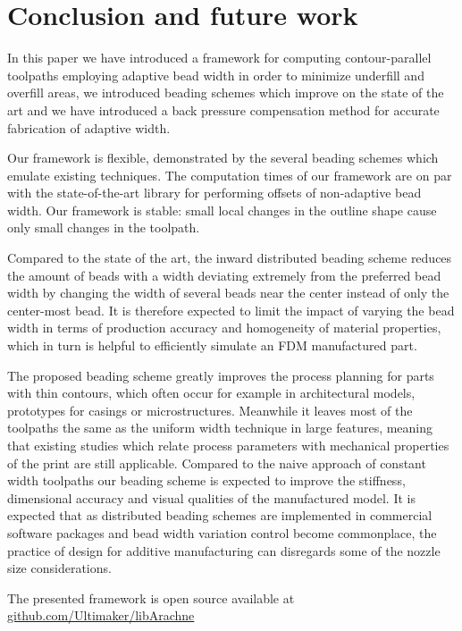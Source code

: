 \section{Conclusion and future work}
In this paper we have introduced a framework for computing contour-parallel toolpaths employing adaptive bead width in order to minimize underfill and overfill areas{,
we introduced beading schemes which improve on the state of the art
and we have introduced a back pressure compensation method for accurate fabrication of adaptive width.
}

Our framework is flexible, demonstrated by the several beading schemes which emulate existing techniques.
The computation times of our framework are on par with the state-of-the-art library for performing offsets of non-adaptive bead width.
Our framework is stable: small local changes in the outline shape cause only small changes in the toolpath.

{Compared to the state of the art,} the inward distributed beading scheme
reduces the amount of beads with a width deviating extremely from the preferred bead width {by changing the width of several beads near the center instead of only the center-most bead}.
{It is therefore} expected to limit the impact of varying the bead width in terms of production accuracy and homogeneity of material properties,
which in turn is helpful to efficiently simulate an FDM manufactured part.


The proposed beading scheme greatly improves the process planning for parts with thin contours, which often occur for example in architectural models, prototypes for casings or microstructures.
Meanwhile it leaves most of the toolpaths the same as the uniform width technique in large features, meaning that existing studies which relate process parameters with mechanical properties of the print are still applicable.
{Compared to the naive approach of constant width toolpaths our beading scheme is expected to improve the stiffness, dimensional accuracy and visual qualities of the manufactured model.}
{It is expected that as distributed beading schemes are implemented in commercial software packages and bead width variation control become commonplace, the practice of design for additive manufacturing can disregards some of the nozzle size considerations.}

\medskip
{The presented framework is open source available at \\ \url{github.com/Ultimaker/libArachne}}


